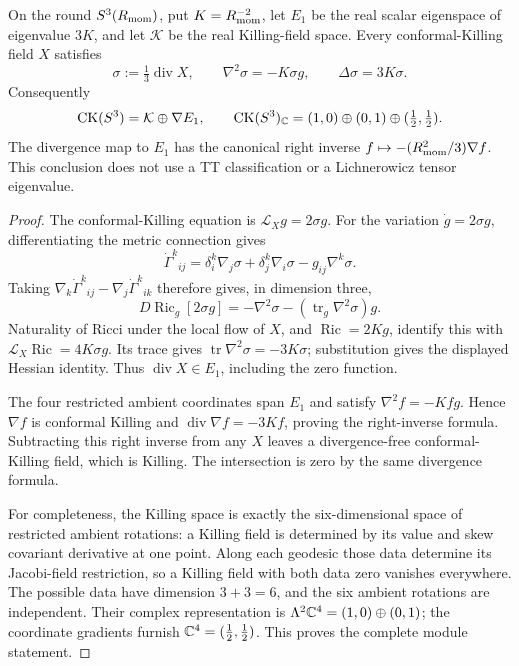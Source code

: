\documentclass[11pt]{article}
\begin{document}
\begin{lemma}
\label{p1:lem:conformal-killing-exhaustion}
On the round \(S^3(R_{\mathrm{mom}})\), put \(K=R_{\mathrm{mom}}^{-2}\), let \(E_1\) be the
real scalar eigenspace of eigenvalue \(3K\), and let \(\mathcal K\) be the
real Killing-field space.  Every conformal-Killing field \(X\) satisfies
\[
 \sigma:=\tfrac13\operatorname{div}X,\qquad
 \nabla^2\sigma=-K\sigma g,\qquad \Delta\sigma=3K\sigma.
\]
Consequently
\[
 \operatorname{CK}(S^3)=\mathcal K\oplus\nabla E_1,
 \qquad
 \operatorname{CK}(S^3)_{\mathbb{C}}
 =(1,0)\oplus(0,1)\oplus(\tfrac12,\tfrac12).
\]
The divergence map to \(E_1\) has the canonical right inverse
\(f\mapsto-(R_{\mathrm{mom}}^2/3)\nabla f\).  This conclusion does not use a TT
classification or a Lichnerowicz tensor eigenvalue.
\end{lemma}

\begin{proof}
The conformal-Killing equation is \(\mathcal L_Xg=2\sigma g\).  For the
variation \(\dot g=2\sigma g\), differentiating the metric connection gives
\[
 \dot\Gamma^k{}_{ij}
 =\delta^k_i\nabla_j\sigma+\delta^k_j\nabla_i\sigma
   -g_{ij}\nabla^k\sigma.
\]
Taking \(\nabla_k\dot\Gamma^k{}_{ij}-\nabla_j\dot\Gamma^k{}_{ik}\)
therefore gives, in dimension three,
\[
 D\operatorname{Ric}_g[2\sigma g]
 =-\nabla^2\sigma-(\operatorname{tr}_g\nabla^2\sigma)g.
\]
Naturality of Ricci under the local flow of \(X\), and
\(\operatorname{Ric}=2Kg\), identify this with
\(\mathcal L_X\operatorname{Ric}=4K\sigma g\).  Its trace gives
\(\operatorname{tr}\nabla^2\sigma=-3K\sigma\); substitution gives the
displayed Hessian identity.  Thus \(\operatorname{div}X\in E_1\), including
the zero function.

The four restricted ambient coordinates span \(E_1\) and satisfy
\(\nabla^2f=-Kfg\).  Hence \(\nabla f\) is conformal Killing and
\(\operatorname{div}\nabla f=-3Kf\), proving the right-inverse formula.
Subtracting this right inverse from any \(X\) leaves a divergence-free
conformal-Killing field, which is Killing.  The intersection is zero by the
same divergence formula.

For completeness, the Killing space is exactly the six-dimensional space
of restricted ambient rotations: a Killing field is determined by its value
and skew covariant derivative at one point.  Along each geodesic those data
determine its Jacobi-field restriction, so a Killing field with both data
zero vanishes everywhere.  The possible data have dimension \(3+3=6\),
and the six ambient rotations are independent.  Their complex representation
is \(\Lambda^2\mathbb{C}^4=(1,0)\oplus(0,1)\); the coordinate gradients furnish
\(\mathbb{C}^4=(\tfrac12,\tfrac12)\).  This proves the complete module statement.
\end{proof}
\end{document}
